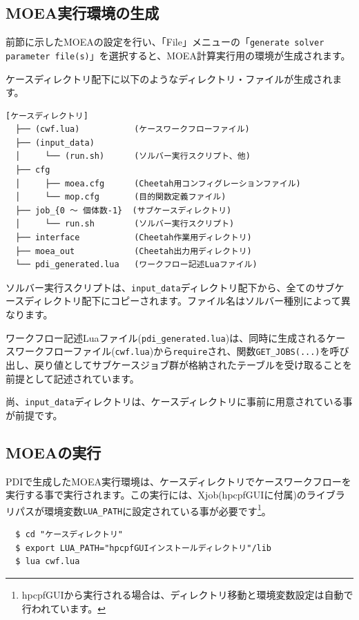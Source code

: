 \documentclass[a4paper,11pt]{jarticle}
\begin{document}
{\begin{description}
\end{description}


\subsection{MOEA実行環境の生成}

前節に示したMOEAの設定を行い、「File」メニューの「{\tt generate solver parameter file(s)}」を選択すると、MOEA計算実行用の環境が生成されます。

ケースディレクトリ配下に以下のようなディレクトリ・ファイルが生成されます。

\begin{verbatim}
[ケースディレクトリ]
  ├── (cwf.lua)           (ケースワークフローファイル)
  ├── (input_data)
  │     └── (run.sh)      (ソルバー実行スクリプト、他)
  ├── cfg
  │     ├── moea.cfg      (Cheetah用コンフィグレーションファイル)
  │     └── mop.cfg       (目的関数定義ファイル)
  ├── job_{0 〜 個体数-1}  (サブケースディレクトリ)
  │     └── run.sh        (ソルバー実行スクリプト)
  ├── interface           (Cheetah作業用ディレクトリ)
  ├── moea_out            (Cheetah出力用ディレクトリ)
  └── pdi_generated.lua   (ワークフロー記述Luaファイル)
\end{verbatim}

ソルバー実行スクリプトは、{\tt input\_data}ディレクトリ配下から、全てのサブケースディレクトリ配下にコピーされます。ファイル名はソルバー種別によって異なります。

ワークフロー記述Luaファイル({\tt pdi\_generated.lua})は、同時に生成されるケースワークフローファイル({\tt cwf.lua})から{\tt require}され、関数{\tt GET\_JOBS(...)}を呼び出し、戻り値としてサブケースジョブ群が格納されたテーブルを受け取ることを前提として記述されています。

尚、{\tt input\_data}ディレクトリは、ケースディレクトリに事前に用意されている事が前提です。


\subsection{MOEAの実行}

PDIで生成したMOEA実行環境は、ケースディレクトリでケースワークフローを実行する事で実行されます。この実行には、Xjob(hpcpfGUIに付属)のライブラリパスが環境変数{\tt LUA\_PATH}に設定されている事が必要です\footnote{hpcpfGUIから実行される場合は、ディレクトリ移動と環境変数設定は自動で行われています。}。

\begin{verbatim}
  $ cd "ケースディレクトリ"
  $ export LUA_PATH="hpcpfGUIインストールディレクトリ"/lib
  $ lua cwf.lua
\end{verbatim}

}
\end{document}
